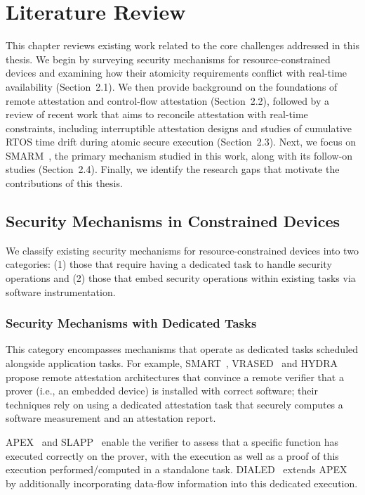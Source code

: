 \documentclass[a4paper,10pt]{article}
\begin{document}
\section{Literature Review}
\label{ch:literature}
This chapter reviews existing work related to the core challenges addressed 
in this thesis. We begin by surveying security mechanisms for resource-constrained 
devices and examining how their atomicity requirements conflict with real-time 
availability (Section~2.1). We then provide background on the foundations of 
remote attestation and control-flow attestation (Section~2.2), followed by a 
review of recent work that aims to reconcile attestation with real-time 
constraints, including interruptible attestation designs and studies of
cumulative RTOS time drift during atomic secure execution (Section~2.3).
Next, we focus on SMARM~\cite{carpent2018smarm}, 
the primary mechanism studied in this work, along with its follow-on studies 
(Section~2.4). Finally, we identify the research gaps that motivate the 
contributions of this thesis.

\subsection{Security Mechanisms in Constrained Devices}

We classify existing security mechanisms for resource-constrained devices into two categories: (1) those that require having a dedicated task to handle security operations and (2) those that embed security operations within existing tasks via software instrumentation.

\subsubsection{Security Mechanisms with Dedicated Tasks}
This category encompasses mechanisms that operate as dedicated tasks scheduled alongside application tasks. 
For example, SMART~\cite{eldefrawy2012smart}, VRASED~\cite{nunes2019vrased} and HYDRA~\cite{eldefrawy2017hydra} propose remote attestation architectures that convince a remote verifier that a prover (i.e., an embedded device) is installed with correct software; their techniques rely on using a dedicated attestation task that securely computes a software measurement and an attestation report.

APEX~\cite{apex} and SLAPP~\cite{slapp} enable the verifier to assess that a specific function has executed correctly on the prover, with the execution as well as a proof of this execution performed/computed in a standalone task. 
DIALED~\cite{dialed} extends APEX by additionally incorporating data-flow information into this dedicated execution.
\end{document}
